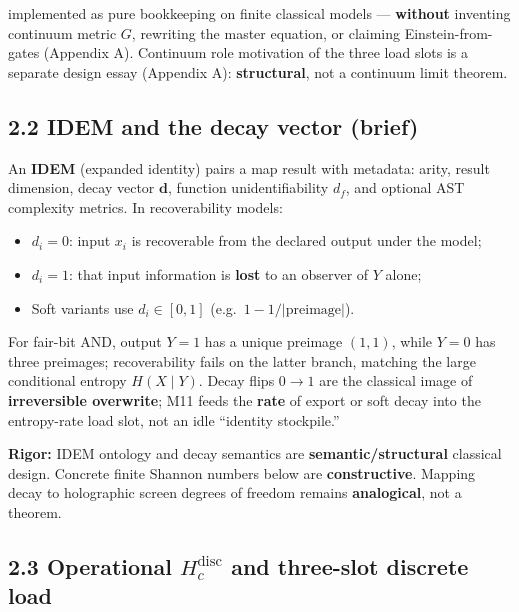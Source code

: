 \documentclass[
  11pt,
]{article}
\providecommand{\tightlist}{%
  \setlength{\itemsep}{0pt}\setlength{\parskip}{0pt}}
\begin{document}
implemented as pure bookkeeping on finite classical models ---
\textbf{without} inventing continuum metric \(G\), rewriting the master
equation, or claiming Einstein-from-gates (Appendix A). Continuum role
motivation of the three load slots is a separate design essay (Appendix
A): \textbf{structural}, not a continuum limit theorem.

\subsection{2.2 IDEM and the decay vector
(brief)}\label{idem-and-the-decay-vector-brief}

An \textbf{IDEM} (expanded identity) pairs a map result with metadata:
arity, result dimension, decay vector \(\mathbf{d}\), function
unidentifiability \(d_f\), and optional AST complexity metrics. In
recoverability models:

\begin{itemize}
\tightlist
\item
  \(d_i=0\): input \(x_i\) is recoverable from the declared output under
  the model;\\
\item
  \(d_i=1\): that input information is \textbf{lost} to an observer of
  \(Y\) alone;\\
\item
  Soft variants use \(d_i\in[0,1]\) (e.g.~\(1-1/|\mathrm{preimage}|\)).
\end{itemize}

For fair-bit AND, output \(Y=1\) has a unique preimage \((1,1)\), while
\(Y=0\) has three preimages; recoverability fails on the latter branch,
matching the large conditional entropy \(H(X\mid Y)\). Decay flips
\(0\to 1\) are the classical image of \textbf{irreversible overwrite};
M11 feeds the \textbf{rate} of export or soft decay into the
entropy-rate load slot, not an idle ``identity stockpile.''

\textbf{Rigor:} IDEM ontology and decay semantics are
\textbf{semantic/structural} classical design. Concrete finite Shannon
numbers below are \textbf{constructive}. Mapping decay to holographic
screen degrees of freedom remains \textbf{analogical}, not a theorem.

\subsection{\texorpdfstring{2.3 Operational \(H_c^{\mathrm{disc}}\) and
three-slot discrete
load}{2.3 Operational H\_c\^{}\{\textbackslash mathrm\{disc\}\} and three-slot discrete load}}\label{operational-h_cmathrmdisc-and-three-slot-discrete-load}
\end{document}
